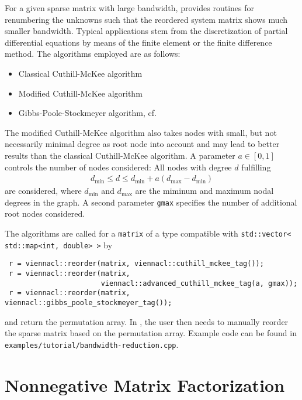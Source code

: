For a given sparse matrix with large bandwidth, {\ViennaCL} provides routines for renumbering the unknowns such that the reordered system matrix shows much
smaller bandwidth. Typical applications stem from the discretization of partial differential equations by means of the finite element or the finite difference
method. The algorithms employed are as follows:
\begin{itemize}
 \item Classical Cuthill-McKee algorithm \cite{cuthill:reducing-bandwidth}
 \item Modified Cuthill-McKee algorithm \cite{cuthill:reducing-bandwidth}
 \item Gibbs-Poole-Stockmeyer algorithm, cf.~\cite{lewis:gps-algorithm}
\end{itemize}
The modified Cuthill-McKee algorithm also takes nodes with small, but not necessarily minimal degree as root node into account and may lead to better results
than the classical Cuthill-McKee algorithm. A parameter $a \in [0,1]$ controls the number of nodes considered: All nodes with degree $d$ fulfilling
\begin{align*}
 d_{\min} \leq d \leq d_{\min} + a(d_{\max} - d_{\min})
\end{align*}
are considered, where $d_{\min}$ and $d_{\max}$ are the miminum and maximum nodal degrees in the graph. A second parameter \lstinline|gmax| specifies the
number of additional root nodes considered.

The algorithms are called for a \lstinline|matrix| of a type compatible with \lstinline|std::vector< std::map<int, double> >| by
\begin{lstlisting}
 r = viennacl::reorder(matrix, viennacl::cuthill_mckee_tag());
 r = viennacl::reorder(matrix,
                       viennacl::advanced_cuthill_mckee_tag(a, gmax));
 r = viennacl::reorder(matrix, viennacl::gibbs_poole_stockmeyer_tag());
\end{lstlisting}
and return the permutation array. In {\ViennaCLversion}, the user then needs to manually reorder the sparse matrix based on the permutation array. Example code
can be found in \lstinline|examples/tutorial/bandwidth-reduction.cpp|.


\section{Nonnegative Matrix Factorization}

